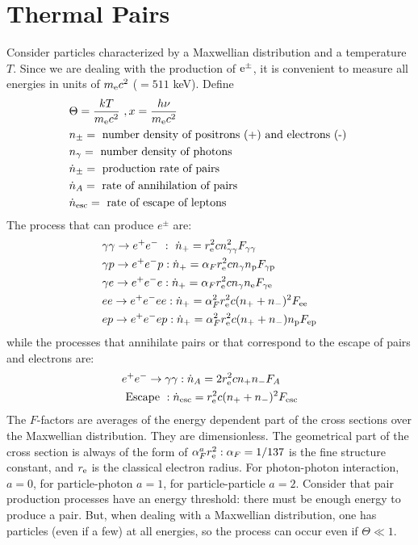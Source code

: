 \documentclass[12pt,a4paper]{article}
\begin{document}
\section{Thermal Pairs}
Consider particles characterized by a Maxwellian distribution and a temperature $T$. Since we are dealing with the production of $\rm e^\pm$, it is convenient to measure all energies in units of $m_{\rm e} c^2$ ($= 511$ keV). Define
\begin{align}
& \Theta = \dfrac{kT}{m_{\rm e} c^2} ~, x = \dfrac{h\nu}{m_{\rm e} c^2} \\
& n_\pm = \text{ number density of positrons (+) and electrons (-) } \\
& n_\gamma = \text{ number density of photons } \\
& \dot{n}_\pm = \text{ production rate of pairs } \\
& \dot{n}_A = \text{ rate of annihilation of pairs } \\
& \dot{n}_{\rm esc} = \text{ rate of escape of leptons }
\end{align}
The process that can produce $e^\pm$ are:
\begin{align}
& \gamma \gamma \rightarrow e^+ e^- ~: ~ \dot{n}_+ = r_{\rm e}^2 c n_{\gamma\gamma}^2 F_{\gamma\gamma} \\
& \gamma p \rightarrow e^+ e^- p : \dot{n}_+ = \alpha_F r_{\rm e}^2 c n_\gamma n_{\rm p} F_{\rm \gamma p} \\
& \gamma e \rightarrow e^+ e^- e : \dot{n}_+ = \alpha_F r_{\rm e}^2 c n_\gamma n_{\rm e} F_{\rm \gamma e} \\
& e e \rightarrow e^+ e^- e e : \dot{n}_+ = \alpha_F^2 r_{\rm e}^2 c (n_+ + n_-)^2 F_{\rm e e} \\
& e p \rightarrow e^+ e^- e p : \dot{n}_+ = \alpha_F^2 r_{\rm e}^2 c (n_+ + n_-) n_{\rm p} F_{\rm e p}
\end{align}
while the processes that annihilate pairs or that correspond to the escape of pairs and electrons are:
\begin{align}
& e^+ e^- \rightarrow \gamma \gamma : \dot{n}_A = 2r_{\rm e}^2 c n_+ n_- F_A \\
& \text{ Escape } : \dot{n}_{\rm esc} = r_{\rm e}^2 c (n_+ +n_-)^2 F_{\rm esc} \\
\end{align}
The $F$-factors are averages of the energy dependent part of the cross sections over the Maxwellian distribution. They are dimensionless. The geometrical part of the cross section is always of the form of $\alpha_F^a r_{\rm e}^2: \alpha_F = 1/137$ is the fine structure constant, and $r_{\rm e}$ is the classical electron radius. For photon-photon interaction, $a = 0$, for particle-photon $a = 1$, for particle-particle $a = 2$. Consider that pair production processes have an energy threshold: there must be enough energy to produce a pair. But, when dealing with a Maxwellian distribution, one has particles (even if a few) at all energies, so the process can occur even if $\Theta \ll 1$. 




\end{document}

